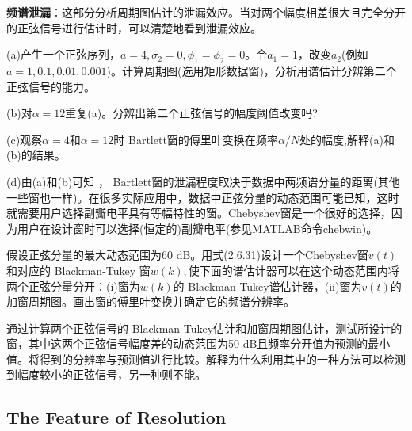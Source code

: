 \documentclass[UTF-8, a4paper, 12pt]{ctexart}
\begin{document}
{\bfseries 频谱泄漏}：这部分分析周期图估计的泄漏效应。当对两个幅度相差很大且完全分开的正弦信号进行估计时，可以清楚地看到泄漏效应。

(a)产生一个正弦序列，$ a =4, \sigma_2=0,\phi_1=\phi_2=0$。令$a_1 = 1$，改变$a_2$(例如$a = 1,0.1,0.01,0.001$)。计算周期图(选用矩形数据窗)，分析用谱估计分辨第二个正弦信号的能力。

(b)对$\alpha = 12$重复(a)。分辨出第二个正弦信号的幅度阈值改变吗?

(c)观察$\alpha=4$和$\alpha= 12$时 Bartlett窗的傅里叶变换在频率$\alpha/N$处的幅度,解释(a)和(b)的结果。

(d)由(a)和(b)可知 ， Bartlett窗的泄漏程度取决于数据中两频谱分量的距离(其他一些窗也一样)。在很多实际应用中，数据中正弦分量的动态范围可能已知，这时就需要用户选择副瓣电平具有等幅特性的窗。Chebyshev窗是一个很好的选择，因为用户在设计窗时可以选择(恒定的)副瓣电平(参见MATLAB命令chebwin)。

假设正弦分量的最大动态范围为60 dB。用式(2.6.31)设计一个Chebyshev窗$v( t)$和对应的 Blackman-Tukey 窗$w(k),$使下面的谱估计器可以在这个动态范围内将两个正弦分量分开：(i)窗为$w(k)$的 Blackman-Tukey谱估计器，(ii)窗为$v(t)$的加窗周期图。画出窗的傅里叶变换并确定它的频谱分辨率。

通过计算两个正弦信号的 Blackman-Tukey估计和加窗周期图估计，测试所设计的窗，其中这两个正弦信号幅度差的动态范围为50 dB且频率分开值为预测的最小值。将得到的分辨率与预测值进行比较。解释为什么利用其中的一种方法可以检测到幅度较小的正弦信号，另一种则不能。

\subsection{The Feature of Resolution}
\end{document}
